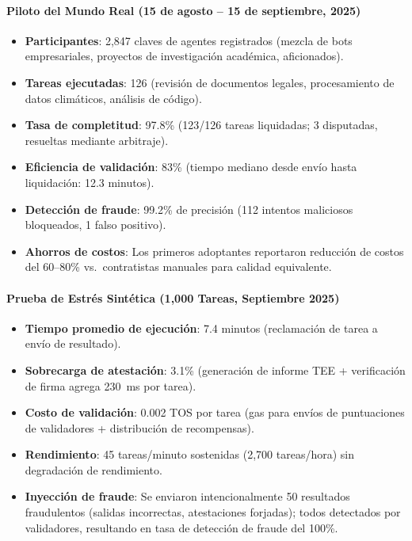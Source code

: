 \documentclass[11pt]{article}
\begin{document}
\paragraph{Piloto del Mundo Real (15 de agosto -- 15 de septiembre, 2025)}
\begin{itemize}[noitemsep]
  \item \textbf{Participantes}: 2,847 claves de agentes registrados (mezcla de bots empresariales, proyectos de investigación académica, aficionados).
  \item \textbf{Tareas ejecutadas}: 126 (revisión de documentos legales, procesamiento de datos climáticos, análisis de código).
  \item \textbf{Tasa de completitud}: 97.8\% (123/126 tareas liquidadas; 3 disputadas, resueltas mediante arbitraje).
  \item \textbf{Eficiencia de validación}: 83\% (tiempo mediano desde envío hasta liquidación: 12.3 minutos).
  \item \textbf{Detección de fraude}: 99.2\% de precisión (112 intentos maliciosos bloqueados, 1 falso positivo).
  \item \textbf{Ahorros de costos}: Los primeros adoptantes reportaron reducción de costos del 60--80\% vs.\ contratistas manuales para calidad equivalente.
\end{itemize}

\paragraph{Prueba de Estrés Sintética (1,000 Tareas, Septiembre 2025)}
\begin{itemize}[noitemsep]
  \item \textbf{Tiempo promedio de ejecución}: 7.4 minutos (reclamación de tarea a envío de resultado).
  \item \textbf{Sobrecarga de atestación}: 3.1\% (generación de informe TEE + verificación de firma agrega 230~ms por tarea).
  \item \textbf{Costo de validación}: 0.002 TOS por tarea (gas para envíos de puntuaciones de validadores + distribución de recompensas).
  \item \textbf{Rendimiento}: 45 tareas/minuto sostenidas (2,700 tareas/hora) sin degradación de rendimiento.
  \item \textbf{Inyección de fraude}: Se enviaron intencionalmente 50 resultados fraudulentos (salidas incorrectas, atestaciones forjadas); todos detectados por validadores, resultando en tasa de detección de fraude del 100\%.
\end{itemize}
\end{document}
